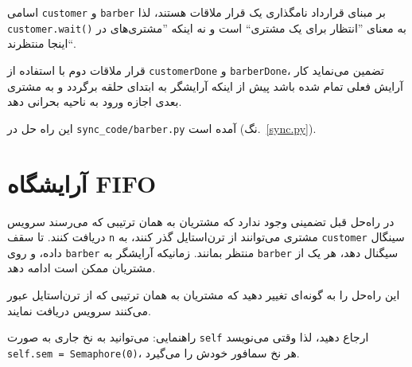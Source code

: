 \documentclass{book}
\newcommand{\clearemptydoublepage}{\newpage\cleardoublepage}
\begin{document}
    اسامی {\tt customer} و {\tt barber} بر مبنای قرارداد نامگذاری یک قرار ملاقات هستند، لذا {\tt customer.wait()} 
    به معنای ''انتظار برای یک مشتری`` است و نه اینکه ''مشتری‌های در اینجا منتظرند``. 

    قرار ملاقات دوم با استفاده از  {\tt customerDone} و {\tt barberDone}، تضمین می‌نماید کار آرایش فعلی تمام شده باشد
    پیش از اینکه آرایشگر به ابتدای حلقه برگردد و به مشتری بعدی اجازه ورود به ناحیه بحرانی دهد. 

    این راه حل در \verb"sync_code/barber.py" آمده است (نگ.~\ref{sync.py}).

\clearemptydoublepage
\section{آرایشگاه FIFO}

    در راه‌حل قبل تضمینی وجود ندارد که مشتریان به همان ترتیبی که می‌رسند سرویس دریافت کنند. 
    تا سقف {\tt n} مشتری می‌توانند از ترن‌استایل گذر کنند، به {\tt customer} سینگال داده، 
    و روی {\tt barber} منتظر بمانند. زمانیکه آرایشگر به {\tt barber} سیگنال دهد، هر یک از 
    مشتریان ممکن است ادامه دهد.

	این راه‌حل را به گونه‌ای تغییر دهید که مشتریان به همان ترتیبی که از ترن‌استایل عبور می‌کنند سرویس دریافت نمایند.
  
	راهنمایی: می‌توانید به نخ جاری به صورت {\tt self} ارجاع دهید، 
	لذا وقتی می‌نویسد {\tt self.sem = Semaphore(0)}، هر نخ سمافور خودش را می‌گیرد.
\end{document}
